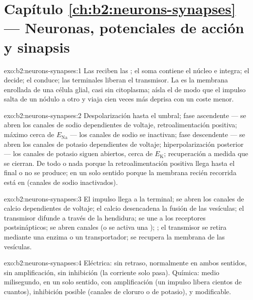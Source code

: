 \section*{Capítulo \ref{ch:b2:neurons-synapses} --- Neuronas, potenciales de acción y sinapsis}

\begin{solution}{exo:b2:neurons-synapses:1}
Las  reciben las ; el soma contiene el núcleo e integra;
el  decide; el  conduce; las terminales liberan el
transmisor. La  es la membrana enrollada de una célula glial, casi
sin citoplasma; aísla el  de modo que el impulso salta de un nódulo a
otro y viaja cien veces más deprisa con un coste menor.
\end{solution}

\begin{solution}{exo:b2:neurons-synapses:2}
Despolarización hasta el umbral; fase ascendente --- se abren los canales
de sodio dependientes de voltaje, retroalimentación positiva; máximo cerca
de $E_{\mathrm{Na}}$ --- los canales de sodio se inactivan; fase
descendente --- se abren los canales de potasio dependientes de voltaje;
hiperpolarización posterior --- los canales de potasio siguen abiertos,
cerca de
$E_{\mathrm K}$; recuperación a medida que se cierran. De todo o nada
porque la retroalimentación positiva llega hasta el final o no se produce;
en un solo sentido porque la membrana recién recorrida está en  (canales de sodio inactivados).
\end{solution}

\begin{solution}{exo:b2:neurons-synapses:3}
El impulso llega a la terminal; se abren los canales de calcio dependientes
de voltaje; el calcio desencadena la fusión de las vesículas; el
transmisor difunde a través de la hendidura; se une a los receptores
postsinápticos; se abren canales (o se activa una ); ; el transmisor se retira mediante una enzima o un
transportador; se recupera la membrana de las vesículas.
\end{solution}

\begin{solution}{exo:b2:neurons-synapses:4}
Eléctrica: sin retraso, normalmente en ambos sentidos, sin amplificación,
sin inhibición (la corriente solo pasa). Química: medio milisegundo, en un
solo sentido, con amplificación (un impulso libera cientos de cuantos),
inhibición posible (canales de cloruro o de potasio), y modificable.
\end{solution}


